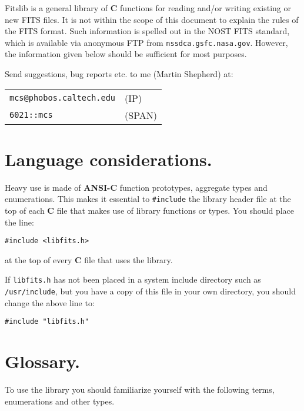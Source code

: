 Fitslib is a general library of {\bf C} functions for reading and/or writing
existing or new FITS files. It is not within the scope of this document to
explain the rules of the FITS format. Such information is spelled out
in the NOST FITS standard, which is available via anonymous FTP from
\verb`nssdca.gsfc.nasa.gov`. However, the information given below should be
sufficient for most purposes.

Send suggestions, bug reports etc. to me (Martin Shepherd) at:\\
\vspace{1ex}
\begin{tabular}{ll}
\verb`mcs@phobos.caltech.edu` &  (IP)\\
\verb`6021::mcs`              &  (SPAN)\\
\end{tabular}

\section{Language considerations.}

Heavy use is made of {\bf ANSI-C} function prototypes, aggregate
types and enumerations. This makes it essential to \verb`#include` the
library header file at the top of each {\bf C} file that makes use of
library functions or types. You should place the line:

\begin{verbatim}
#include <libfits.h>
\end{verbatim}

at the top of every {\bf C} file that uses the library.

If \verb`libfits.h` has not been placed in a system include directory
such as \verb`/usr/include`, but you have a copy of this file
in your own directory, you should change the above line to:

\begin{verbatim}
#include "libfits.h"
\end{verbatim}

\section{Glossary.}

To use the library you should familiarize yourself with the following
terms, enumerations and other types.

